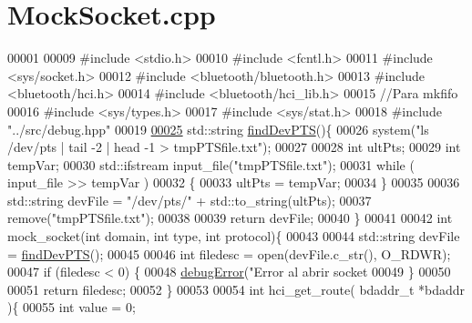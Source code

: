 \hypertarget{MockSocket_8cpp_source}{}\section{Mock\+Socket.\+cpp}
\label{MockSocket_8cpp_source}

\begin{DoxyCode}
00001 
00009 \textcolor{preprocessor}{#include <stdio.h>}
00010 \textcolor{preprocessor}{#include <fcntl.h>}
00011 \textcolor{preprocessor}{#include <sys/socket.h>}
00012 \textcolor{preprocessor}{#include <bluetooth/bluetooth.h>}
00013 \textcolor{preprocessor}{#include <bluetooth/hci.h>}
00014 \textcolor{preprocessor}{#include <bluetooth/hci\_lib.h>}
00015 \textcolor{comment}{//Para mkfifo}
00016 \textcolor{preprocessor}{#include <sys/types.h>}
00017 \textcolor{preprocessor}{#include <sys/stat.h>}
00018 \textcolor{preprocessor}{#include "../src/debug.hpp"}
00019 
\hyperlink{MockSocket_8cpp_a33fe4c99996c8de03c33962525663851}{00025} std::string \hyperlink{MockSocket_8cpp_a33fe4c99996c8de03c33962525663851}{findDevPTS}()\{
00026     system(\textcolor{stringliteral}{"ls /dev/pts | tail -2 | head -1 > tmpPTSfile.txt"});
00027 
00028     \textcolor{keywordtype}{int} ultPts;
00029     \textcolor{keywordtype}{int} tempVar;
00030     std::ifstream input\_file(\textcolor{stringliteral}{"tmpPTSfile.txt"});
00031     \textcolor{keywordflow}{while} ( input\_file >> tempVar )
00032     \{
00033         ultPts = tempVar;
00034     \}
00035 
00036     std::string devFile = \textcolor{stringliteral}{"/dev/pts/"} + std::to\_string(ultPts);
00037     \textcolor{keyword}{remove}(\textcolor{stringliteral}{"tmpPTSfile.txt"});
00038 
00039     \textcolor{keywordflow}{return} devFile;
00040 \}
00041 
00042 \textcolor{keywordtype}{int} mock\_socket(\textcolor{keywordtype}{int} domain, \textcolor{keywordtype}{int} type, \textcolor{keywordtype}{int} protocol)\{
00043 
00044     std::string devFile = \hyperlink{MockSocket_8cpp_a33fe4c99996c8de03c33962525663851}{findDevPTS}();
00045 
00046     \textcolor{keywordtype}{int} filedesc = open(devFile.c\_str(), O\_RDWR);
00047     \textcolor{keywordflow}{if} (filedesc < 0) \{
00048         \hyperlink{debug_8hpp_a06cd512b8b15b6da31a5a557445f7027}{debugError}(\textcolor{stringliteral}{"Error al abrir socket %
00049     \}
00050 
00051     \textcolor{keywordflow}{return} filedesc;
00052 \}
00053 
00054 \textcolor{keywordtype}{int} hci\_get\_route( bdaddr\_t *bdaddr )\{
00055     \textcolor{keywordtype}{int} value = 0;
}
\end{DoxyCode}
